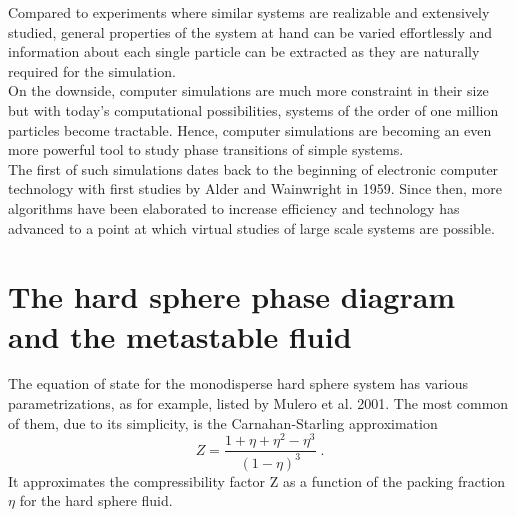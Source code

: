 Compared to experiments where similar systems are realizable and extensively studied, general properties of the system at hand can be varied effortlessly and information about each single particle can be extracted as they are naturally required for the simulation.\\

On the downside, computer simulations are much more constraint in their size but with today's computational possibilities, systems of the order of one million particles become tractable. Hence, computer simulations are becoming an even more powerful tool to study phase transitions of simple systems.\\

The first of such simulations dates back to the beginning of electronic computer technology with first studies by Alder and Wainwright in 1959\cite{Alders59}. Since then, more algorithms have been elaborated to increase efficiency and technology has advanced to a point at which virtual studies of large scale systems are possible.

\section{The hard sphere phase diagram and the metastable fluid}
\label{sec:HS_phase_diagram}
The equation of state for the monodisperse hard sphere system has various parametrizations, as for example, listed by Mulero et al. 2001\cite{Mulero2001}. The most common of them, due to its simplicity, is the Carnahan-Starling approximation\cite{Carnahan1969}
\begin{equation}
\label{eqn:CS}
Z=\frac{1+\eta+\eta^2-\eta^3}{(1-\eta)^3} \; \text{.}
\end{equation}
It approximates the compressibility factor Z as a function of the packing fraction $\eta$ for the hard sphere fluid.\\

